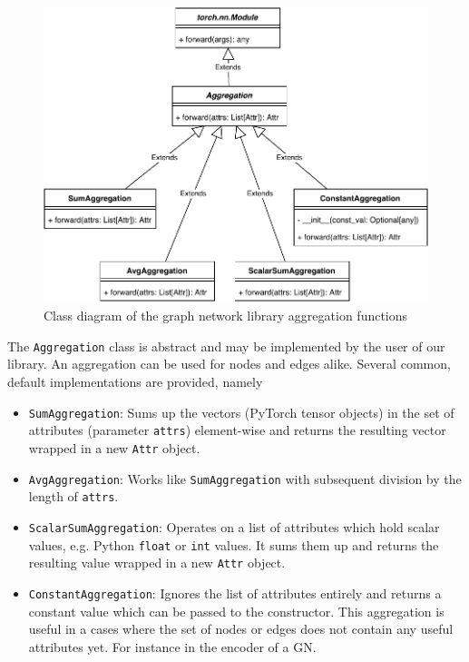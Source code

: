 \begin{figure}\centering
    \includegraphics[scale=0.65]{resources/graphnets-functions-aggr}
    \caption{Class diagram of the graph network library aggregation functions}\label{fig:classdiagramgnfunctionsaggr}
\end{figure}

The \texttt{Aggregation} class is abstract and may be implemented by the user of our library. An aggregation can be used for nodes and edges alike. Several common, default implementations are provided, namely

\begin{itemize}
    \item \texttt{SumAggregation}: Sums up the vectors (PyTorch tensor objects) in the set of attributes (parameter \texttt{attrs}) element-wise and returns the resulting vector wrapped in a new \texttt{Attr} object.
    \item \texttt{AvgAggregation}: Works like \texttt{SumAggregation} with subsequent division by the length of \texttt{attrs}.
    \item \texttt{ScalarSumAggregation}: Operates on a list of attributes which hold scalar values, e.g. Python \texttt{float} or \texttt{int} values. It sums them up and returns the resulting value wrapped in a new \texttt{Attr} object.
    \item \texttt{ConstantAggregation}: Ignores the list of attributes entirely and returns a constant value which can be passed to the constructor. This aggregation is useful in a cases where the set of nodes or edges does not contain any useful attributes yet. For instance in the encoder of a GN.
\end{itemize}

